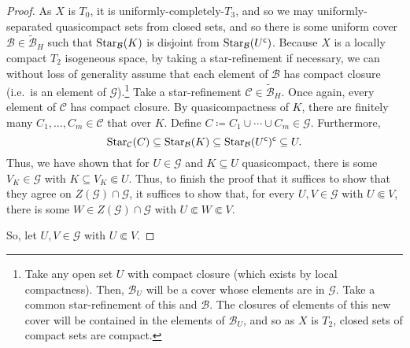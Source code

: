\begin{thm}
\begin{savenotes}
\begin{proof}
As $X$ is $T_0$, it is uniformly-completely-$T_3$, and so we may uniformly-separated quasicompact sets from closed sets, and so there is some uniform cover $\mathcal{B}\in \widetilde{\mathcal{B}}_H$ such that $\operatorname{Star} _{\mathcal{B}}(K)$ is disjoint from $\operatorname{Star} _{\mathcal{B}}(U^{\mathsf{c}})$.  Because $X$ is a locally compact $T_2$ isogeneous space, by taking a star-refinement if necessary, we can without loss of generality assume that each element of $\mathcal{B}$ has compact closure (i.e.~is an element of $\mathcal{G}$).\footnote{Take any open set $U$ with compact closure (which exists by local compactness).  Then, $\mathcal{B}_U$ will be a cover whose elements are in $\mathcal{G}$.  Take a common star-refinement of this and $\mathcal{B}$.  The closures of elements of this new cover will be contained in the elements of $\mathcal{B}_U$, and so as $X$ is $T_2$, closed sets of compact sets are compact.}  Take a star-refinement $\mathcal{C}\in \widetilde{\mathcal{B}}_H$.  Once again, every element of $\mathcal{C}$ has compact closure.  By quasicompactness of $K$, there are finitely many $C_1,\ldots ,C_m\in \mathcal{C}$ that over $K$.  Define $C\coloneqq C_1\cup \cdots \cup C_m\in \mathcal{G}$.  Furthermore,
\begin{equation}
\operatorname{Star} _{\mathcal{C}}(C)\subseteq \operatorname{Star} _{\mathcal{B}}(K)\subseteq \operatorname{Star} _{\mathcal{B}}(U^{\mathsf{c}})^{\mathsf{c}}\subseteq U.
\end{equation}
Thus, we have shown that for $U\in \mathcal{G}$ and $K\subseteq U$ quasicompact, there is some $V_K\in \mathcal{G}$ with $K\subseteq V_K\Subset U$.  Thus, to finish the proof that it suffices to show that they agree on $Z(\mathcal{G})\cap \mathcal{G}$, it suffices to show that, for every $U,V\in \mathcal{G}$ with $U\Subset V$, there is some $W\in Z(\mathcal{G})\cap \mathcal{G}$ with $U\Subset W\Subset V$.

So, let $U,V\in \mathcal{G}$ with $U\Subset V$.
\end{proof}
\end{savenotes}
\end{thm}